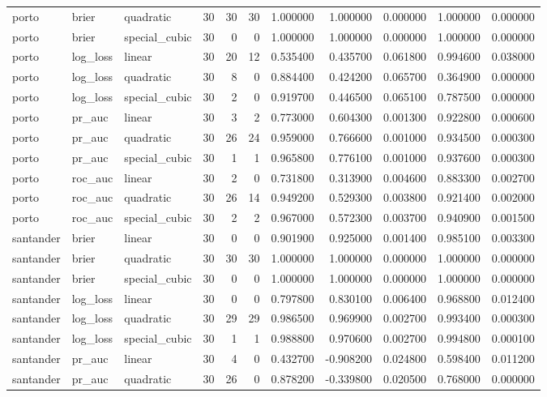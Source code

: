 \begin{longtable}{lllrrrrrrrr}
porto & brier & quadratic & 30 & 30 & 30 & 1.000000 & 1.000000 & 0.000000 & 1.000000 & 0.000000 \\
porto & brier & special\_cubic & 30 & 0 & 0 & 1.000000 & 1.000000 & 0.000000 & 1.000000 & 0.000000 \\
porto & log\_loss & linear & 30 & 20 & 12 & 0.535400 & 0.435700 & 0.061800 & 0.994600 & 0.038000 \\
porto & log\_loss & quadratic & 30 & 8 & 0 & 0.884400 & 0.424200 & 0.065700 & 0.364900 & 0.000000 \\
porto & log\_loss & special\_cubic & 30 & 2 & 0 & 0.919700 & 0.446500 & 0.065100 & 0.787500 & 0.000000 \\
porto & pr\_auc & linear & 30 & 3 & 2 & 0.773000 & 0.604300 & 0.001300 & 0.922800 & 0.000600 \\
porto & pr\_auc & quadratic & 30 & 26 & 24 & 0.959000 & 0.766600 & 0.001000 & 0.934500 & 0.000300 \\
porto & pr\_auc & special\_cubic & 30 & 1 & 1 & 0.965800 & 0.776100 & 0.001000 & 0.937600 & 0.000300 \\
porto & roc\_auc & linear & 30 & 2 & 0 & 0.731800 & 0.313900 & 0.004600 & 0.883300 & 0.002700 \\
porto & roc\_auc & quadratic & 30 & 26 & 14 & 0.949200 & 0.529300 & 0.003800 & 0.921400 & 0.002000 \\
porto & roc\_auc & special\_cubic & 30 & 2 & 2 & 0.967000 & 0.572300 & 0.003700 & 0.940900 & 0.001500 \\
santander & brier & linear & 30 & 0 & 0 & 0.901900 & 0.925000 & 0.001400 & 0.985100 & 0.003300 \\
santander & brier & quadratic & 30 & 30 & 30 & 1.000000 & 1.000000 & 0.000000 & 1.000000 & 0.000000 \\
santander & brier & special\_cubic & 30 & 0 & 0 & 1.000000 & 1.000000 & 0.000000 & 1.000000 & 0.000000 \\
santander & log\_loss & linear & 30 & 0 & 0 & 0.797800 & 0.830100 & 0.006400 & 0.968800 & 0.012400 \\
santander & log\_loss & quadratic & 30 & 29 & 29 & 0.986500 & 0.969900 & 0.002700 & 0.993400 & 0.000300 \\
santander & log\_loss & special\_cubic & 30 & 1 & 1 & 0.988800 & 0.970600 & 0.002700 & 0.994800 & 0.000100 \\
santander & pr\_auc & linear & 30 & 4 & 0 & 0.432700 & -0.908200 & 0.024800 & 0.598400 & 0.011200 \\
santander & pr\_auc & quadratic & 30 & 26 & 0 & 0.878200 & -0.339800 & 0.020500 & 0.768000 & 0.000000 \\

\end{longtable}
